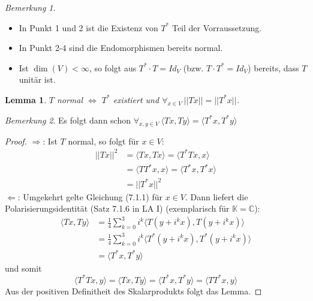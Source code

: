 \documentclass[12pt,a4paper]{article}
\newtheorem{lemma}[theorem]{Lemma}
\theoremstyle{definition}
\theoremstyle{remark}
\newtheorem*{remark}{Bemerkung}
\begin{document}
	\begin{remark}
		\begin{itemize}
			\item In Punkt 1 und 2 ist die Existenz von $T^*$ Teil der Vorraussetzung.
			\item In Punkt 2-4 sind die Endomorphismen bereits normal.
			\item Ist $\dim (V)<\infty$, so folgt aus $T^* \cdot T = Id_V$ (bzw. $T \cdot T^* = Id_V$) bereits, dass $T$ unitär ist. 
		\end{itemize}
	\end{remark}
	\begin{lemma}
		$T$ normal $\Leftrightarrow$ $T^*$ existiert und $\forall_{x \in V} \  ||Tx|| = ||T^*x || $. \\
	\end{lemma}
	\begin{remark}
		Es folgt dann schon $\forall_{x,y \in V} \ \langle Tx, Ty \rangle = \langle T^*x,T^*y \rangle$
	\end{remark}
	
	\begin{proof}
		$\Rightarrow$: Ist $T$ normal, so folgt für $x \in V$:
		\begin{equation}
			\begin{split}
				||Tx ||^2 &= \langle Tx,Tx \rangle = \langle T^*Tx,x \rangle \\
				&= \langle TT^*x,x\rangle = \langle T^*x,T^*x \rangle \\
				&= ||T^*x ||^2
			\end{split}
		\end{equation}
		$\Leftarrow$: Umgekehrt gelte Gleichung (7.1.1) für $x \in V$. Dann liefert die Polarisierungsidentität (Satz 7.1.6 in LA I) (exemplarisch für $\mathbb{K} = \mathbb{C}$):
		\begin{equation}
			\begin{split}
				\langle Tx, Ty \rangle &= \frac{1}{4} \sum\limits_{k=0}^3 i^k \langle T(y+i^kx), T(y+i^kx) \rangle \\
				& = \frac{1}{4} \sum\limits_{k=0}^3 i^k \langle T^*(y+i^kx),T^*(y+i^kx) \rangle \\
				&= \langle T^*x,T^*y \rangle
			\end{split}
		\end{equation}
		und somit
		\begin{equation}
			\langle T^*Tx,y \rangle = \langle Tx,Ty \rangle = \langle T^*x, T^*y \rangle = \langle TT^*x,y \rangle
		\end{equation}
		Aus der positiven Definitheit des Skalarprodukts folgt das Lemma.
	\end{proof} 
	
\end{document}
